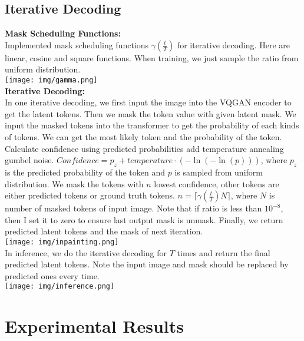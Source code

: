 \documentclass{article} %
\begin{document}
    \subsection{Iterative Decoding}
    \textbf{Mask Scheduling Functions:}\\
    Implemented mask scheduling functions $\gamma(\frac{t}{T})$ for iterative decoding. 
    Here are linear, cosine and square functions. When training, we just sample the ratio from uniform distribution.\\
    \texttt{[image: img/gamma.png]}\\
    \textbf{Iterative Decoding:}\\
    In one iterative decoding, we first input the image into the VQGAN encoder to get the latent tokens.
    Then we mask the token value with given latent mask.
    We input the masked tokens into the transformer to get the probability of each kinds of tokens.
    We can get the most likely token and the probability of the token.
    Calculate confidence using predicted probabilities add temperature annealing gumbel noise.
    $Confidence = p_{z} + temperature \cdot (-\ln(-\ln(p)))$, where $p_{z}$ is the predicted probability of the token and $p$ is sampled from uniform distribution.
    We mask the tokens with $n$ lowest confidence, other tokens are either predicted tokens or ground truth tokens. $n=\lceil \gamma(\frac{t}{T}) N \rceil$, where $N$ is number of masked tokens of input image.
    Note that if ratio is less than $10^{-8}$, then I set it to zero to ensure last output mask is unmask.
    Finally, we return predicted latent tokens and the mask of next iteration.\\
    \texttt{[image: img/inpainting.png]}\\
    In inference, we do the iterative decoding for $T$ times and return the final predicted latent tokens.
    Note the input image and mask should be replaced by predicted ones every time.\\
    \texttt{[image: img/inference.png]}\\
    
    \section{Experimental Results}
\end{document}
